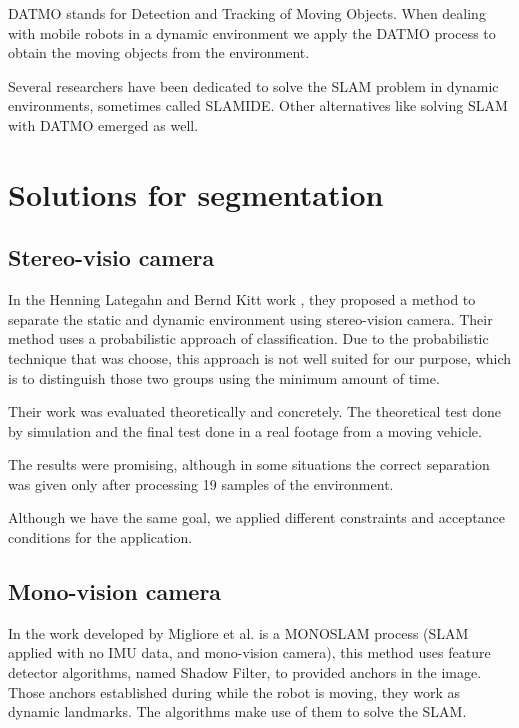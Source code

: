 DATMO stands for Detection and Tracking of Moving Objects. When dealing with mobile robots in a dynamic environment we apply the DATMO process to obtain the moving objects from the environment.

Several researchers have been dedicated to solve the SLAM problem in dynamic environments, sometimes called SLAMIDE\cite{bibbyrss07}. Other alternatives like solving SLAM with DATMO\cite{Wang02simultaneouslocalization} emerged as well.

\section{Solutions for segmentation}

\subsection{Stereo-visio camera}

In the Henning Lategahn and Bernd Kitt work \cite{DBLP:conf/ivs/LategahnGHKE11}, they proposed a method to separate the static and dynamic environment using stereo-vision camera. Their method uses a probabilistic approach of classification. Due to the probabilistic technique that was choose, this approach is not well suited for our purpose, which is to distinguish those two groups using the minimum amount of time.

Their work was evaluated theoretically and concretely. The theoretical test done by simulation and the final test done in a real footage from a moving vehicle.

The results were promising, although in some situations the correct separation was given only after processing 19 samples of the environment. 

Although we have the same goal, we applied different constraints and acceptance conditions for the application. 

\subsection{Mono-vision camera}

In the work developed by Migliore et al. \cite{Migliore_2009_ICRA} is a MONOSLAM process (SLAM applied with no IMU data, and mono-vision camera), this method uses feature detector algorithms, named Shadow Filter, to provided anchors in the image. Those anchors established during while the robot is moving, they work as dynamic landmarks. The algorithms make use of them to solve the SLAM.

